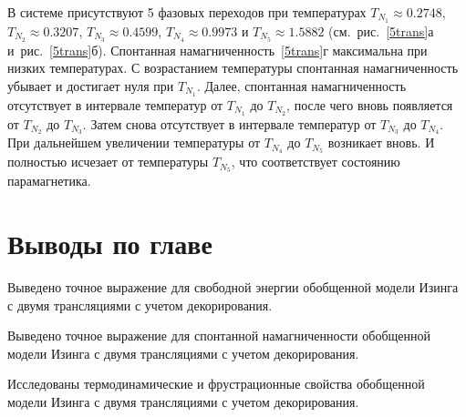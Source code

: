 В системе присутствуют 5 фазовых переходов при температурах $T_{N_1} \approx 0.2748$, $T_{N_2} \approx 0.3207$, $T_{N_3} \approx 0.4599$, $T_{N_4} \approx 0.9973$ и $T_{N_5} \approx 1.5882$ (см.~рис.~\ref{5trans}а и~рис.~\ref{5trans}б). Спонтанная намагниченность~\ref{5trans}г максимальна при низких температурах. С возрастанием температуры спонтанная намагниченность убывает и достигает нуля при $T_{N_1}$. Далее, спонтанная намагниченность отсутствует в интервале температур от $T_{N_1}$ до $T_{N_2}$, после чего вновь появляется от $T_{N_2}$ до $T_{N_3}$. Затем снова отсутствует в интервале температур от $T_{N_3}$ до $T_{N_4}$. При дальнейшем увеличении температуры от $T_{N_4}$ до $T_{N_5}$ возникает вновь. И полностью исчезает от температуры $T_{N_5}$, что соответствует состоянию парамагнетика. 

\section{Выводы по главе}

Выведено точное выражение для свободной энергии обобщенной модели Изинга с двумя трансляциями с учетом декорирования.

Выведено точное выражение для спонтанной намагниченности обобщенной модели Изинга с двумя трансляциями с учетом декорирования.

Исследованы термодинамические и фрустрационные свойства обобщенной модели Изинга с двумя трансляциями с учетом декорирования.

\FloatBarrier